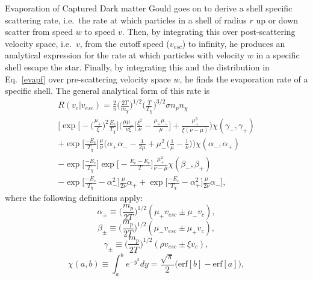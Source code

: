 \documentclass[a4paper,11pt]{article}
\begin{document}
\begin{section}{Evaporation of Captured Dark matter}
    Gould goes on to derive a shell specific scattering rate, i.e.~the rate at which particles in a shell of radius $r$ up or down scatter from speed $w$ to speed $v$.
    Then, by integrating this over post-scattering velocity space, i.e.~$v$, from the cutoff speed ($v_{esc}$) to infinity, he produces an analytical expression for the rate at which particles with velocity $w$ in a specific shell escape the star.
    Finally, by integrating this and the distribution in Eq.~\ref{evapf} over pre-scattering velocity space $w$, he finds the evaporation rate of a specific shell.
    The general analytical form of this rate is
    \begin{multline}
        R(v_c|v_{esc}) = \frac{2}{\pi} \bigg(\frac{2T}{m_\chi}\bigg)^{1/2} \bigg(\frac{T}{T_\chi}\bigg)^{3/2} \sigma n_p n_\chi \\
        \Bigg[\exp\bigg[-\Big(\frac{\mu_+}{\xi}\Big)^2 \frac{E_e}{T_\chi}\bigg] \bigg( \frac{\mu\mu_-}{\nu\xi} \Big[\frac{\xi^2}{\nu} - \frac{\mu_+\mu_-}{\mu} \Big] + \frac{\mu_+^3}{\xi(\nu -\mu)}  \bigg) \chi(\gamma_-, \gamma_+) \\
        + \exp\Big[\frac{-E_c}{T_\chi}\Big] \frac{\mu}{\nu} \bigg(\alpha_+ \alpha_- - \frac{1}{2\mu} + \mu_-^2 \Big(\frac{1}{\mu} - \frac{1}{\nu}\Big) \bigg)\chi(\alpha_-, \alpha_+) \\ 
        - \exp\Big[\frac{-E_c}{T_\chi}\Big] \exp\Big[-\frac{E_e - E_c}{T}\Big] \frac{\mu_+^2}{\nu-\mu}\chi(\beta_-, \beta_+)      \\
        - \exp\Big[\frac{-E_c}{T_\chi} - \alpha_-^2\Big] \frac{\mu}{2\nu} \alpha_+ + \exp\Big[\frac{-E_c}{T_\chi} - \alpha_+^2\Big] \frac{\mu}{2\nu} \alpha_- \Bigg],
        \label{evapr}
    \end{multline}
    where the following definitions apply:
    \begin{equation*}
        \alpha_{\pm} \equiv \Big(\frac{m_p}{2T}\Big)^{1/2} (\mu_+ v_{esc} \pm \mu_- v_{c}) , 
    \end{equation*}
    \begin{equation*}
        \beta_{\pm} \equiv \Big(\frac{m_p}{2T}\Big)^{1/2} (\mu_- v_{esc} \pm \mu_+ v_{c}) ,
    \end{equation*}
    \begin{equation*}
        \gamma_{\pm} \equiv \Big(\frac{m_p}{2T}\Big)^{1/2} (\rho v_{esc} \pm \xi v_{c}) , 
    \end{equation*}
    \begin{equation*}
        \chi(a,b) \equiv \int^b_a e^{-y^2} dy = \frac{\sqrt{\pi}}{2} \Big(\text{erf}[b] - \text{erf}[a] \Big), 

\end{equation*}
\end{section}
\end{document}
